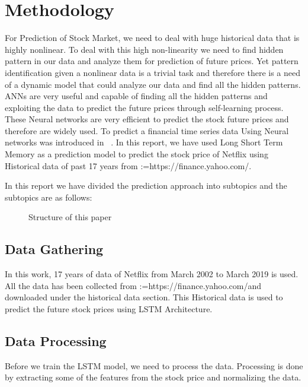 \documentclass[5p,,preprint,12pt,twocolumn]{elsarticle}
\makeatletter
\def\BreakURLText#1{\@tfor\brk@tempa:=#1\do{\brk@tempa\hskip0pt}}
\def\fixFloatSize#1{}%
\makeatother
\begin{document}
\section{Methodology}
For Prediction of Stock Market, we need to deal with huge historical data that is highly nonlinear. To deal with this high non-linearity we need to find hidden pattern in our data and analyze them for prediction of future prices. Yet pattern identification given a nonlinear data is a trivial task and therefore there is a need of a dynamic model that could analyze our data and find all the hidden patterns. ANNs are very useful and capable of finding all the hidden patterns and exploiting the data to predict the future prices through self-learning process. These Neural networks are very efficient to predict the stock future prices and therefore are widely used. To predict a financial time series data Using Neural networks was introduced in \unskip~\cite{490201:11043819}. In this report, we have used Long Short Term Memory as a prediction model to predict the stock price of Netflix using Historical data of past 17 years from \BreakURLText{https://finance.yahoo.com/.}

In this report we have divided the prediction approach into subtopics and the subtopics are as follows:


\bgroup
\fixFloatSize{images/ff2d5313-9bc0-492d-8c3c-45f092930fcf-ustructure-of-this-paper1.jpg}
\begin{figure*}[!htbp]
\centering \makeatletter{}
\makeatother 
\caption{{Structure of this paper}}
\label{f-ccbedd1c3cc3}
\end{figure*}
\egroup




\subsection{Data Gathering}In this work, 17 years of data of Netflix from March 2002 to March 2019 is used. All the data has been collected from \BreakURLText{https://finance.yahoo.com/}\textbf{\space }and downloaded under the historical data section. This Historical data is used to predict the future stock prices using LSTM Architecture.



\subsection{Data Processing}Before we train the LSTM model, we need to process the data. Processing is done by extracting some of the features from the stock price and normalizing the data.
\end{document}
